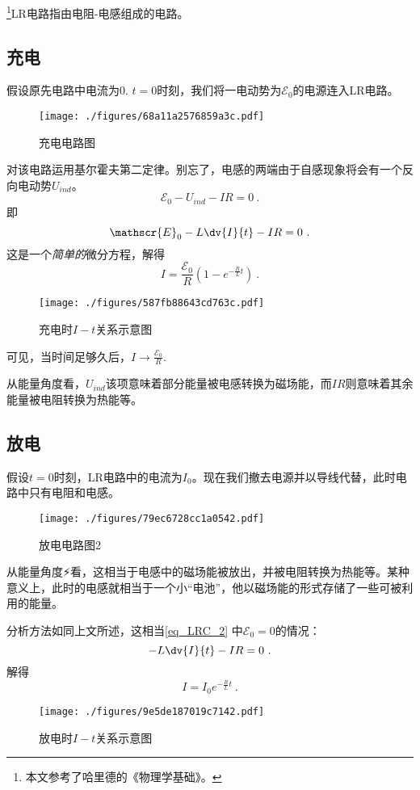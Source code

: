 

\footnote{本文参考了哈里德的《物理学基础》。}LR电路指由电阻-电感组成的电路。

\subsection{充电}
假设原先电路中电流为$0$. $t=0$时刻，我们将一电动势为$\mathscr{E}_0$的电源连入LR电路。
\begin{figure}[ht]
\centering
\texttt{[image: ./figures/68a11a2576859a3c.pdf]}
\caption{充电电路图} \label{fig_LRC_1}
\end{figure}

对该电路运用基尔霍夫第二定律。别忘了，电感的两端由于自感现象将会有一个反向电动势$U_{ind}$。
$$
\mathscr{E}_0 - U_{ind} - IR = 0~.
$$
即
\begin{equation}\label{eq_LRC_2}
\mathscr{E}_0 - L\dv{I}{t} - IR = 0~.
\end{equation}
这是一个\textsl{简单的}微分方程，解得
\begin{equation}\label{eq_LRC_1}
I = \frac{\mathscr{E}_0}{R} (1-e^{-\frac{R}{L}t})~.
\end{equation}

\begin{figure}[ht]
\centering
\texttt{[image: ./figures/587fb88643cd763c.pdf]}
\caption{充电时$I-t$关系示意图} \label{fig_LRC_3}
\end{figure}
可见，当时间足够久后，$I\to\frac{\mathscr{E_0}}{R}$.

从能量角度看，$U_{ind}$该项意味着部分能量被电感转换为磁场能，而$IR$则意味着其余能量被电阻转换为热能等。

\subsection{放电}
假设$t=0$时刻，LR电路中的电流为$I_0$。现在我们撤去电源并以导线代替，此时电路中只有电阻和电感。
\begin{figure}[ht]
\centering
\texttt{[image: ./figures/79ec6728cc1a0542.pdf]}
\caption{放电电路图2} \label{fig_LRC_2}
\end{figure}
从能量角度⚡️看，这相当于电感中的磁场能被放出，并被电阻转换为热能等。某种意义上，此时的电感就相当于一个小“电池”，他以磁场能的形式存储了一些可被利用的能量。

分析方法如同上文所述，这相当\autoref{eq_LRC_2}  中$\mathscr{E}_0=0$的情况：
\begin{equation}
- L\dv{I}{t} - IR = 0~.
\end{equation}
解得
\begin{equation}
I = I_0 e^{-\frac{R}{L}t}~.
\end{equation}
\begin{figure}[ht]
\centering
\texttt{[image: ./figures/9e5de187019c7142.pdf]}
\caption{放电时$I-t$关系示意图} \label{fig_LRC_4}
\end{figure}
